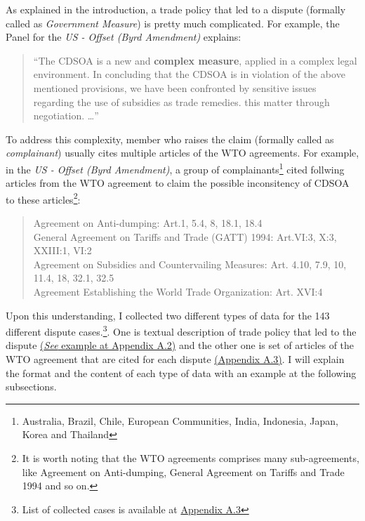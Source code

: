As explained in the introduction,
a trade policy that led to a dispute (formally called as \textit{Government Measure}) is pretty much complicated.
For example, the Panel for the \textit{US - Offset (Byrd Amendment)} explains:

\begin{quote}
    ``The CDSOA is a new and \textbf{complex measure}, applied in a complex legal environment. In
    concluding that the CDSOA is in violation of the above mentioned provisions, we have been
    confronted by sensitive issues regarding the use of subsidies as trade remedies.
    this matter through negotiation. \ldots''
\end{quote}

\noindent To address this complexity, member who raises the claim (formally called as \textit{complainant}) usually cites multiple articles of the WTO agreements. For example, in the
\textit{US - Offset (Byrd Amendment)},
a group of complainants\footnote{Australia,
    Brazil,
    Chile,
    European Communities,
    India,
    Indonesia,
    Japan,
    Korea and Thailand}
cited follwing articles from the WTO agreement to claim the possible inconsitency of CDSOA to these articles\footnote{It is worth noting that the WTO agreements comprises many sub-agreements, like Agreement on Anti-dumping, General Agreement on Tariffs and Trade 1994 and so on.}:

\begin{quote}
    Agreement on Anti-dumping: Art.1, 5.4, 8, 18.1, 18.4\\
    General Agreement on Tariffs and Trade (GATT) 1994: Art.VI:3, X:3, XXIII:1, VI:2 \\
    Agreement on Subsidies and Countervailing Measures: Art. 4.10, 7.9, 10, 11.4, 18, 32.1, 32.5\\
    Agreement Establishing the World Trade Organization: Art. XVI:4
\end{quote}

\noindent Upon this understanding, 
I collected two different types of data for the 143 different dispute cases.\footnote{List of collected cases is
    available at \hyperref[sub:cited-articles-table]{Appendix A.3}
}.
One is textual description of trade policy
that led to the dispute \hyperref[sub:factual-aspect-example]{(\textit{See} example at Appendix A.2)} and the other one is
set of articles of the WTO agreement that are
cited for each dispute \hyperref[sub:cited-articles-table]{(Appendix A.3)}.
I will explain the format and the content of
each type of data with an example at the following subsections.

